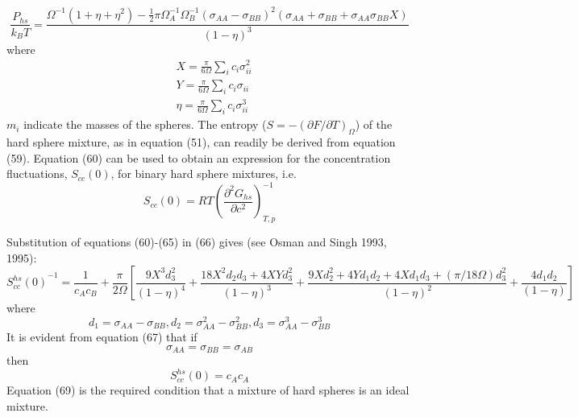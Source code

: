 \documentclass[12pt]{article}
\newcommand*{\1}{\hspace{1pt}}
\begin{document}
        \begin{equation}
            \frac{P _{hs}}{k_{B}T} = \frac{\Omega ^{-1}(1 + \eta + \eta^2) - \frac{1}{2}\pi 
            \Omega ^{-1}_{A}\Omega ^{-1}_{B}(\sigma_{AA} - \sigma_{BB})^{2}
            (\sigma_{AA} + \sigma_{BB} + \sigma_{AA}\sigma_{BB}X)}{(1 - \eta)^3}
        \end{equation}
    where
    \begin{align}
        &  X = \frac{\pi}{6\Omega } \sum_{i}^{}c_{i}\sigma^{2}_{ii}  \\
        &  Y = \frac{\pi}{6\Omega } \sum_{i}^{}c_{i}\sigma_{ii} \\
        &  \eta = \frac{\pi}{6\Omega } \sum_{i}^{}c_{i}\sigma^{3}_{ii} 
        \end{align}
    $m_i$ indicate the masses of the spheres. The entropy ($S = -\left(\partial F/\partial T\right)_\Omega $) 
    of the hard sphere
    mixture, as in equation (51), can readily be derived from equation (59). Equation (60)
    can be used to obtain an expression for the concentration fluctuations, $S_{cc}(0)$, for binary
    hard sphere mixtures, i.e.
    \begin{equation}
        S_{cc}(0) = RT \left(\frac{\partial^{2}G_{hs}}{\partial c^2}\right) ^{-1}_{T,p}
    \end{equation}

    Substitution of equations (60)-(65) in (66) gives (see Osman and Singh 1993, 1995):
    \begin{equation}
    {S^{hs}_{cc}(0)}^{-1} = \frac{1}{c_{A}c_{B}} + \frac{\pi}{2\Omega }\left[\frac{9X^{3}d^{2}_{3}}{(1 - \eta)^4} +
            \frac{18X^{2}d_{2}d_{3}  +  4XYd^{2}_{3}} 
            {(1 - \eta)^3} + \frac{9Xd^{2}_{2} + 4Yd_{1}d_{2} + 4Xd_{1}d_{3} + (\pi / 18\Omega)d^{2}_{3}}
            {(1 - \eta)^2} + \frac{4d_{1}d_{2}}{(1 - \eta)}\right] 
        \end{equation}
    where
    \begin{equation}
    d_1 = \sigma _{AA} - \sigma _{BB}  ,   
    d_2 = \sigma ^{2}_{AA} - \sigma ^{2}_{BB}  ,  
    d_3 = \sigma ^{3}_{AA} - \sigma ^{3}_{BB}   
    \end{equation} 
    It is evident from equation (67) that if
        \begin{equation}
            \sigma _{AA} = \sigma _{BB} = \sigma _{AB}
        \end{equation}
    then 
    \begin{equation}
        S^{hs}_{cc}(0) =  c_{A}c_{A}
    \end{equation}
    Equation (69) is the required condition that a mixture of hard spheres is an
    ideal mixture.\\
\end{document}
